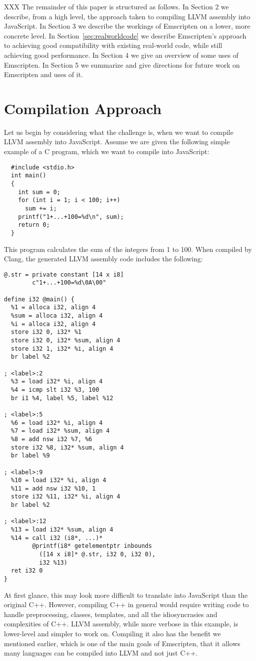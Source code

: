 \documentclass[11pt]{proc}
\begin{document}
XXX The remainder of this paper is structured as follows. In Section 2 we
describe, from a high level, the approach taken to compiling LLVM assembly into JavaScript.
In Section 3 we describe the workings of Emscripten on a lower, more
concrete level.
In Section~\ref{sec:realworldcode} we describe Emscripten's
approach to achieving good compatibility with existing real-world code, while
still achieving good performance.
In Section 4 we give an overview of some uses of
Emscripten. In Section 5 we summarize and give directions for future
work on Emscripten and uses of it.

\section{Compilation Approach}

Let us begin by considering what the challenge is, when we want to compile LLVM assembly
into JavaScript. Assume we are given the
following simple example of a C program, which we want to compile into JavaScript:
\begin{verbatim}
  #include <stdio.h>
  int main()
  {
    int sum = 0;
    for (int i = 1; i < 100; i++)
      sum += i;
    printf("1+...+100=%d\n", sum);
    return 0;
  }
\end{verbatim}
This program calculates the sum of the integers from 1 to 100. When
compiled by Clang, the generated LLVM
assembly code includes the following:
\label{code:examplellvm}
\begin{verbatim}
@.str = private constant [14 x i8]
        c"1+...+100=%d\0A\00"

define i32 @main() {
  %1 = alloca i32, align 4
  %sum = alloca i32, align 4
  %i = alloca i32, align 4
  store i32 0, i32* %1
  store i32 0, i32* %sum, align 4
  store i32 1, i32* %i, align 4
  br label %2

; <label>:2
  %3 = load i32* %i, align 4
  %4 = icmp slt i32 %3, 100
  br i1 %4, label %5, label %12

; <label>:5
  %6 = load i32* %i, align 4
  %7 = load i32* %sum, align 4
  %8 = add nsw i32 %7, %6
  store i32 %8, i32* %sum, align 4
  br label %9

; <label>:9
  %10 = load i32* %i, align 4
  %11 = add nsw i32 %10, 1
  store i32 %11, i32* %i, align 4
  br label %2

; <label>:12
  %13 = load i32* %sum, align 4
  %14 = call i32 (i8*, ...)*
        @printf(i8* getelementptr inbounds
          ([14 x i8]* @.str, i32 0, i32 0),
          i32 %13)
  ret i32 0
}
\end{verbatim}
At first glance, this may look more difficult to translate into
JavaScript than the original C++. However, compiling C++ in
general would require writing code to handle preprocessing,
classes, templates, and all the idiosyncrasies and complexities
of C++. LLVM assembly, while more verbose in this example, is
lower-level and simpler to work on. Compiling it also has the benefit we
mentioned earlier, which
is one of the main goals of Emscripten, that it allows many languages can
be compiled into LLVM and not just C++.
\end{document}
